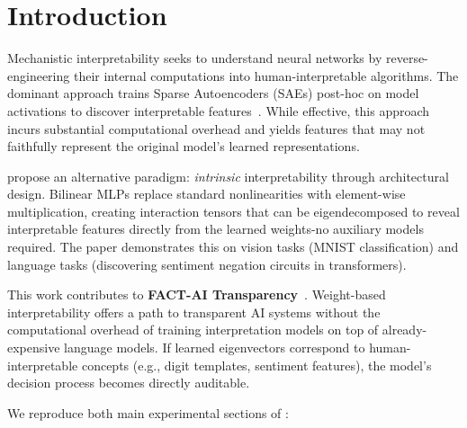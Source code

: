 
\section{Introduction}
\label{sec:introduction}

Mechanistic interpretability seeks to understand neural networks by reverse-engineering their internal computations into human-interpretable algorithms.
The dominant approach trains Sparse Autoencoders (SAEs) post-hoc on model activations to discover interpretable features~\citep{goodfellow2016deep}.
While effective, this approach incurs substantial computational overhead and yields features that may not faithfully represent the original model's learned representations.

\citet{pearce2024bilinear} propose an alternative paradigm: \emph{intrinsic} interpretability through architectural design.
Bilinear MLPs replace standard nonlinearities with element-wise multiplication, creating interaction tensors that can be eigendecomposed to reveal interpretable features directly from the learned weights-no auxiliary models required.
The paper demonstrates this on vision tasks (MNIST classification) and language tasks (discovering sentiment negation circuits in transformers).

This work contributes to \textbf{FACT-AI Transparency}~\citep{fact_manual}.
Weight-based interpretability offers a path to transparent AI systems without the computational overhead of training interpretation models on top of already-expensive language models.
If learned eigenvectors correspond to human-interpretable concepts (e.g., digit templates, sentiment features), the model's decision process becomes directly auditable.

We reproduce both main experimental sections of \citet{pearce2024bilinear}:

